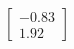 \documentclass[preview]{standalone}
\begin{document}
\begin{align*}
\begin{bmatrix} -0.83 \\ 1.92 \end{bmatrix}
\end{align*}
\end{document}
